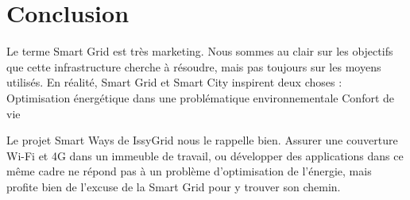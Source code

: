 \chapter{Conclusion}

Le terme Smart Grid est très marketing. Nous sommes au clair sur les objectifs que cette infrastructure cherche à résoudre, mais pas toujours sur les moyens utilisés. 
En réalité, Smart Grid et Smart City inspirent deux choses : 
Optimisation énergétique dans une problématique environnementale 
Confort de vie

Le projet Smart Ways de IssyGrid nous le rappelle bien. Assurer une couverture Wi-Fi et 4G dans un immeuble de travail, ou développer des applications dans ce même cadre ne répond pas à un problème d’optimisation de l'énergie, mais profite bien de l’excuse de la Smart Grid pour y trouver son chemin. 
